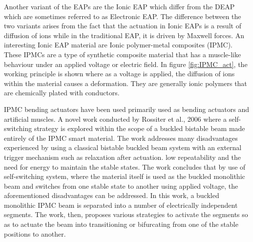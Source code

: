 Another variant of the EAPs are the Ionic EAP which differ from the DEAP which are sometimes referred to as Electronic EAP\cite{bar-cohen_artificial_2005}. The difference between the two variants arises from the fact that the actuation in Ionic EAPs is a result of diffusion of ions while in the traditional EAP, it is driven by Maxwell forces. An interesting Ionic EAP material are Ionic polymer-metal composites (IPMC). These IPMCs are a type of synthetic composite material that has a muscle-like behaviour under an applied voltage or electric field. In figure \ref{fig:IPMC_act}, the working principle is shown where as a voltage is applied, the diffusion of ions within the material causes a deformation. They are generally ionic polymers that are chemically plated with conductors\cite{shahinpoor_ionic_1998}.

IPMC bending actuators have been used primarily used as bending actuators and artificial muscles. A novel work conducted by Rossiter et al., 2006\cite{rossiter_self-switching_2006, rossiter_bistable_2006} where a self-switching strategy is explored within the scope of a buckled bistable beam made entirely of the IPMC smart material. The work addresses many disadvantages experienced by using a classical bistable buckled beam system with an external trigger mechanism such as relaxation after actuation. low repeatability and the need for energy to maintain the stable states. The work concludes that by use of self-switching system, where the material itself is used as the buckled monolithic beam and switches from one stable state to another using applied voltage, the aforementioned disadvantages can be addressed. In this work, a buckled monolithic IPMC beam is separated into a number of electrically independent segments. The work, then, proposes various strategies to activate the segments so as to actuate the beam into transitioning or bifurcating from one of the stable positions to another.
